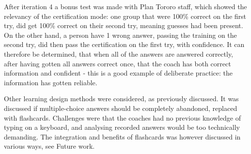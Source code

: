   After iteration 4 a bonus test was made with Plan Tororo staff, which showed the relevancy of the certification mode: one group that were 100\% correct on the first try, did get 100\% correct on their second try, meaning guesses had been present. On the other hand, a person have 1 wrong answer, passing the training on the second try, did then pass the certification on the first try, with confidence. It can therefore be determined, that when all of the answers are answered correctly, after having gotten all answers correct once, that the coach has both correct information and confident - this is a good example of deliberate practice: the information has gotten reliable.

  Other learning design methods were considered, as previously discussed. It was discussed if multiple-choice answers should be completely abandoned, replaced with flashcards. Challenges were that the coaches had no previous knowledge of typing on a keyboard, and analysing recorded answers would be too technically demanding. The integration and benefits of flashcards was however discussed in various ways, see Future work.
